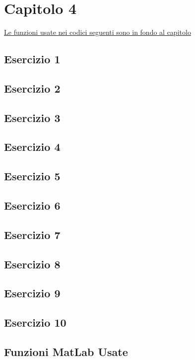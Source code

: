 \section{Capitolo 4}
\underline{Le funzioni usate nei codici seguenti sono in fondo al capitolo}
\subsection{Esercizio 1}

\subsection{Esercizio 2}

\subsection{Esercizio 3}

\subsection{Esercizio 4}

\subsection{Esercizio 5}

\subsection{Esercizio 6}

\subsection{Esercizio 7}

\subsection{Esercizio 8}

\subsection{Esercizio 9}

\subsection{Esercizio 10}

\subsection{Funzioni MatLab Usate}

